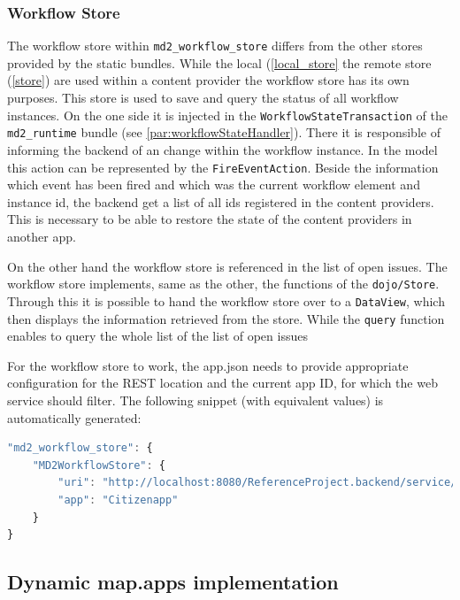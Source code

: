 \subsubsection{Workflow Store} \label{workflow_store}

The workflow store within \lstinline|md2_workflow_store| differs from the other stores provided by the static bundles. While the local (\cref{local_store} the remote store (\cref{store}) are used within a content provider the workflow store has its own purposes. This store is used to save and query the status of all workflow instances. On the one side it is injected in the \lstinline|WorkflowStateTransaction| of the \lstinline|md2_runtime| bundle (see \cref{par:workflowStateHandler}). There it is responsible of informing the backend of an change within the workflow instance. In the model this action can be represented by the \lstinline|FireEventAction|. Beside the information which event has been fired and which was the current workflow element and instance id, the backend get a list of all ids registered in the content providers. This is necessary to be able to restore the state of the content providers in another app.

On the other hand the workflow store is referenced in the list of open issues. The workflow store implements, same as the other, the functions of the \lstinline|dojo/Store|. Through this it is possible to hand the workflow store over to a \lstinline|DataView|, which then displays the information retrieved from the store. While the \lstinline|query| function enables to query the whole list of the list of open issues

For the workflow store to work, the app.json needs to provide appropriate configuration for the REST location and the current app ID, for which the web service should filter. The following snippet (with equivalent values) is automatically generated:
\begin{lstlisting}[language=Javascript]
"md2_workflow_store": {
	"MD2WorkflowStore": {
		"uri": "http://localhost:8080/ReferenceProject.backend/service/workflowState/",
		"app": "Citizenapp"
	}
}
\end{lstlisting}


\subsection{Dynamic map.apps implementation} 




